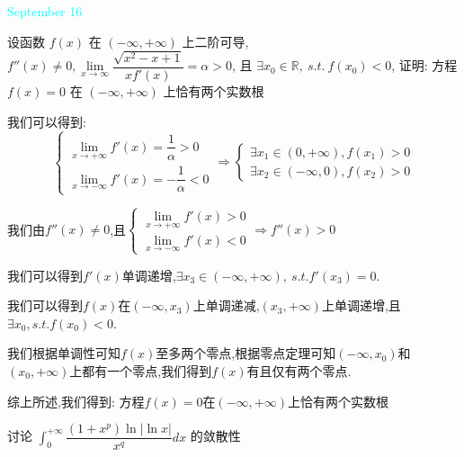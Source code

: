 \textcolor{cyan}{September 16}

\begin{example}[][Exam: 35.3.3]
	设函数 $f(x)$ 在 $(-\infty,+\infty)$ 上二阶可导, $f''(x)\neq 0, \lim\limits_{x\to \infty}\dfrac{\sqrt{x^2-x+1}}{xf'(x)}=\alpha>0$,
	且 $\exists x_{0}\in \mathbb{R},\ s.t.\ f(x_{0})<0$, 证明: 方程 $f(x)=0$ 在 $(-\infty,+\infty)$ 上恰有两个实数根
\end{example}
\begin{solution}

	我们可以得到:  $$\left\lbrace
	\begin{array}{l}
		\lim\limits_{x\to+\infty}f'(x)=\dfrac{1}{\alpha}>0\\
		\lim\limits_{x\to-\infty}f'(x)=-\dfrac{1}{\alpha}<0
	\end{array}
	\right. \Rightarrow\left\lbrace
	\begin{array}{l}
		\exists x_{1}\in(0,+\infty),f(x_{1})>0\\
		\exists x_{2}\in(-\infty,0),f(x_{2})>0
	\end{array}
	\right. $$
	
	我们由$f''(x)\neq 0$,且$\left\lbrace
	\begin{array}{l}
		\lim\limits_{x\to+\infty}f'(x)>0\\
		\lim\limits_{x\to-\infty}f'(x)<0
	\end{array}
	\right. \Rightarrow f''(x)>0$
	
	我们可以得到$f'(x)$单调递增,$\exists x_{3}\in(-\infty,+\infty),\ s.t. f'(x_{3})=0$.
	
	我们可以得到$f(x)$在$(-\infty,x_{3})$上单调递减,$(x_{3},+\infty)$上单调递增,且$\exists x_{0},s.t. f(x_{0})<0$.
	
	我们根据单调性可知$f(x)$至多两个零点,根据零点定理可知$(-\infty,x_{0})$和$(x_{0},+\infty)$上都有一个零点,我们得到$f(x)$有且仅有两个零点.
	
	综上所述,我们得到:  方程$f(x)=0$在$(-\infty,+\infty)$上恰有两个实数根
\end{solution}

\begin{example}[][Exam: 35.3.4]
	讨论 $\int_{0}^{+\infty}\dfrac{(1+x^p)\ln|\ln x|}{x^q}dx$ 的敛散性
\end{example}

